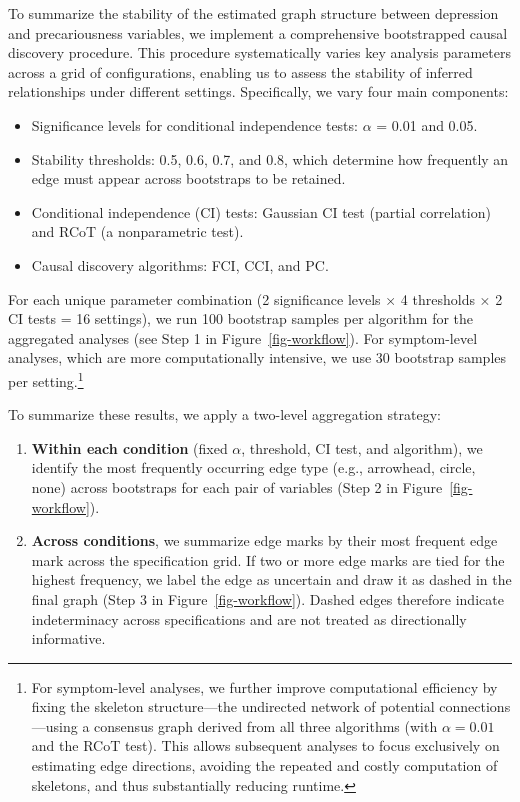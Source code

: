 \documentclass[
]{article}
\providecommand{\tightlist}{%
  \setlength{\itemsep}{0pt}\setlength{\parskip}{0pt}}\usepackage{longtable,booktabs,array}
\begin{document}
\textcolor{BrickRed}{To summarize the stability of the estimated graph structure between depression and precariousness variables, we implement a comprehensive bootstrapped causal discovery procedure.}
This procedure systematically varies key analysis parameters across a
grid of configurations, enabling us to assess the stability of inferred
relationships under different settings. Specifically, we vary four main
components:

\begin{itemize}
\tightlist
\item
  Significance levels for conditional independence tests: \(\alpha\) =
  0.01 and 0.05.
\item
  Stability thresholds: 0.5, 0.6, 0.7, and 0.8, which determine how
  frequently an edge must appear across bootstraps to be retained.
\item
  Conditional independence (CI) tests: Gaussian CI test (partial
  correlation) and RCoT (a nonparametric test).
\item
  Causal discovery algorithms: FCI, CCI, and PC.
\end{itemize}

For each unique parameter combination (2 significance levels × 4
thresholds × 2 CI tests = 16 settings), we run 100 bootstrap samples per
algorithm for the aggregated analyses (see Step 1 in
Figure~\ref{fig-workflow}). For symptom-level analyses, which are more
computationally intensive, we use 30 bootstrap samples per
setting.\footnote{For symptom-level analyses, we further improve
  computational efficiency by fixing the skeleton structure---the
  undirected network of potential connections---using a consensus graph
  derived from all three algorithms (with \(\alpha = 0.01\) and the RCoT
  test). This allows subsequent analyses to focus exclusively on
  estimating edge directions, avoiding the repeated and costly
  computation of skeletons, and thus substantially reducing runtime.}

To summarize these results, we apply a two-level aggregation strategy:

\begin{enumerate}
\def\labelenumi{\arabic{enumi}.}
\tightlist
\item
  \textbf{Within each condition} (fixed \(\alpha\), threshold, CI test,
  and algorithm), we identify the most frequently occurring edge type
  (e.g., arrowhead, circle, none) across bootstraps for each pair of
  variables (Step 2 in Figure~\ref{fig-workflow}).
\item
  \textbf{Across conditions},
  \textcolor{BrickRed}{we summarize edge marks by their most frequent edge mark across the specification grid. If two or more edge marks are tied for the highest frequency, we label the edge as uncertain and draw it as dashed in the final graph}
  (Step 3 in Figure~\ref{fig-workflow}).
  \textcolor{BrickRed}{Dashed edges therefore indicate indeterminacy across specifications and are not treated as directionally informative.}
\end{enumerate}
\end{document}
